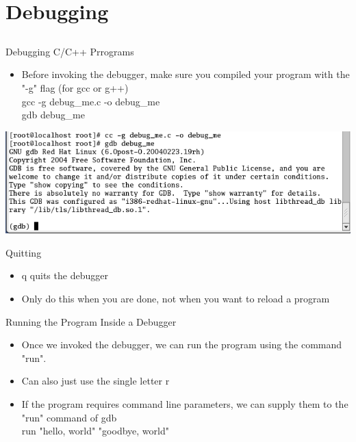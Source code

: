 \documentclass{beamer}
\begin{document}

\section{Debugging}
\subsection{}

\begin{frame}{Debugging C/C++ Prrograms}
\begin{itemize}
\item Before invoking the debugger, make sure you compiled your program with the "-g" flag (for gcc or g++) \\
gcc -g debug\_me.c -o debug\_me \\
gdb debug\_me
\end{itemize}
\includegraphics[width=1.0\textwidth]{../imgs/gdb1.png}
\end{frame}

\begin{frame}{Quitting}
\begin{itemize}
\item q quits the debugger
\item Only do this when you are done, not when you want to reload a program
\end{itemize}
\end{frame}

\begin{frame}{Running the Program Inside a Debugger}
\begin{itemize}
\item Once we invoked the debugger, we can run the program using the command "run".
\item Can also just use the single letter r
\item If the program requires command line parameters, we can supply them to the "run" command of gdb \\
run "hello, world" "goodbye, world"
\end{itemize}
\end{frame}
\end{document}

